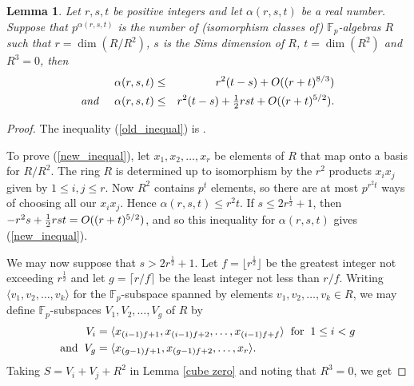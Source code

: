 \documentclass[12pt]{article}
\newtheorem{Lem}[Thm]{Lemma}
\begin{document}
\begin{Lem} \label{alpha}
Let $r, s, t$ be positive integers and let $\alpha(r, s, t)$ be a real number. Suppose that $p^{\alpha(r, s, t)}$ is the number of (isomorphism classes of) $\mathbb{F}_{p}$-algebras $R$ such that 
$r = \dim(R/R^{2})$, $s$ is the Sims dimension of $R$, $t = \dim(R^{2})$ and $R^{3} = 0$, then 
\begin{eqnarray}
\alpha(r, s, t) & \leq & r^{2}(t - s) + \mathnormal{O}((r + t)^{8/3})  \label{old_inequal} \\
 \textit{and} \hspace{5 mm} \alpha(r, s, t) & \leq & r^{2}(t - s) + \tfrac{1}{2}rst + \mathnormal{O}((r + t)^{5/2}). \label{new_inequal}
\end{eqnarray}
\end{Lem}
\begin{proof} The inequality (\ref{old_inequal}) is \cite[Theorem~5.4]{K & P}.
\par To prove (\ref{new_inequal}), let $x_{1}, x_{2}, \ldots, x_{r}$ be elements of $R$ that map onto a basis for $R/R^{2}$. The ring $R$ is determined up to isomorphism by the $r^{2}$ products $x_{i}x_{j}$ given by $1 \leq i, j \leq r$. Now $R^{2}$ contains $p^{t}$ elements, so there are at most $p^{r^{2}t}$ ways of choosing all our $x_{i}x_{j}$. Hence $\alpha(r, s, t) \leq r^{2}t$. If $s \leq 2r^{\frac{1}{2}} + 1$, then $-r^2s+\tfrac{1}{2}rst=\mathnormal{O}((r + t)^{5/2})$, and so this inequality for $\alpha(r, s, t)$ gives (\ref{new_inequal}).
\par We may now suppose that $s > 2r^{\frac{1}{2}} + 1$. Let $f = \lfloor r^{\frac{1}{2}}\rfloor$ be the greatest integer not exceeding $r^{\frac{1}{2}}$ and let $g = \lceil r/f\rceil$ be the least integer not less than $r/f$. Writing $\langle v_1,v_2,\ldots ,v_k\rangle$ for the $\mathbb{F}_{p}$-subspace spanned by elements $v_1,v_2,\ldots ,v_k\in R$, we may define $\mathbb{F}_{p}$-subspaces $V_{1}, V_{2}, \ldots, V_{g}$ of $R$ by
\begin{align*}
V_{i} & = \langle x_{(i-1)f+1}, x_{(i-1)f+2}, \ldots, x_{(i-1)f+f}\rangle  \hspace{2mm} \textrm{for} \hspace{2mm}1 \leq i < g \\
\textrm{and} \hspace{2mm} V_{g} & = \langle x_{(g-1)f+1}, x_{(g-1)f+2}, \ldots, x_{r}\rangle.
\end{align*}
Taking $S = V_{i} + V_{j} + R^{2}$ in Lemma \ref{cube zero} and noting that $R^{3} = 0$, we get

\end{proof}
\end{document}
